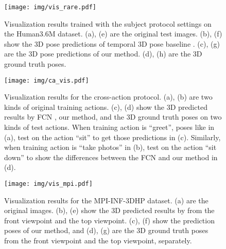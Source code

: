 \documentclass[runningheads]{llncs}
\begin{document}
\begin{figure}
\begin{center}
\texttt{[image: img/vis\_rare.pdf]}
\end{center}
\caption{Visualization results trained with the subject protocol settings on the Human3.6M dataset. (a), (e) are the original test images. (b), (f) show the 3D pose predictions of temporal 3D pose baseline \cite{pavllo20193d}. (c), (g) are the 3D pose predictions of our method. (d), (h) are the 3D ground truth poses.}
\label{fig:vis_hm}
\end{figure}


\begin{figure}
\begin{center}
\texttt{[image: img/ca\_vis.pdf]}
\end{center}
\caption{Visualization results for the cross-action protocol. (a), (b) are two kinds of original training actions. (c), (d) show the 3D predicted results by FCN \cite{martinez2017simple}, our method, and the 3D ground truth poses on two kinds of test actions. When training action is “greet”, poses like in (a), test on the action “sit” to get those predictions in (c). Similarly, when training action is “take photos” in (b), test on the action “sit down” to show the differences between the FCN and our method in (d). }
\label{fig:vis_ca}
\end{figure}

\begin{figure}
\begin{center}
\texttt{[image: img/vis\_mpi.pdf]}
\end{center}
\caption{Visualization results for the MPI-INF-3DHP dataset. (a) are the original images. (b), (e) show the 3D predicted results by \cite{martinez2017simple} from the front viewpoint and the top viewpoint. (c), (f) show the prediction poses of our method, and (d), (g) are the 3D ground truth poses from the front viewpoint and the top viewpoint, separately.}
\label{fig:vis_mpi}
\end{figure}





\clearpage
\end{document}
